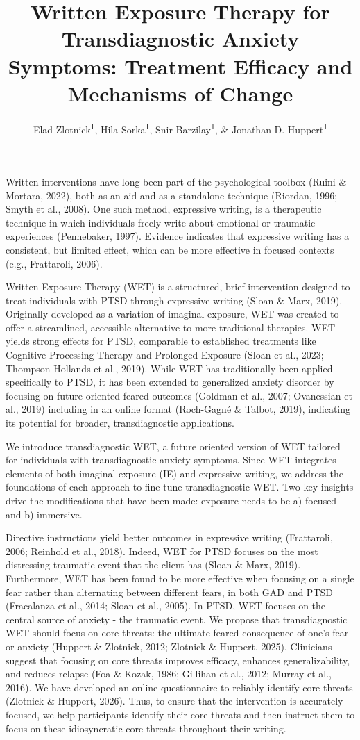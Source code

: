 \documentclass[
  man,floatsintext]{apa7}
\title{Written Exposure Therapy for Transdiagnostic Anxiety Symptoms: Treatment Efficacy and Mechanisms of Change}
\author{Elad Zlotnick\textsuperscript{1}, Hila Sorka\textsuperscript{1}, Snir Barzilay\textsuperscript{1}, \& Jonathan D. Huppert\textsuperscript{1}}
\date{}
\affiliation{\vspace{0.5cm}\textsuperscript{1} The Hebrew University of Jerusalem}
\begin{document}
\maketitle

Written interventions have long been part of the psychological toolbox (Ruini \& Mortara, 2022),
both as an aid and as a standalone technique (Riordan, 1996; Smyth et al., 2008).
One such method, expressive writing, is a therapeutic technique in which individuals freely write about emotional or traumatic experiences (Pennebaker, 1997).
Evidence indicates that expressive writing has a consistent, but limited effect, which can be more effective in focused contexts (e.g., Frattaroli, 2006).

Written Exposure Therapy (WET) is a structured, brief intervention designed to treat individuals with PTSD through expressive writing (Sloan \& Marx, 2019).
Originally developed as a variation of imaginal exposure, WET was created to offer a streamlined, accessible alternative to more traditional therapies.
WET yields strong effects for PTSD, comparable to established treatments like Cognitive Processing Therapy and Prolonged Exposure (Sloan et al., 2023; Thompson-Hollands et al., 2019).
While WET has traditionally been applied specifically to PTSD, it has been extended to generalized anxiety disorder by focusing on future-oriented feared outcomes (Goldman et al., 2007; Ovanessian et al., 2019) including in an online format (Roch-Gagné \& Talbot, 2019), indicating its potential for broader, transdiagnostic applications.

We introduce transdiagnostic WET, a future oriented version of WET tailored for individuals with transdiagnostic anxiety symptoms.
Since WET integrates elements of both imaginal exposure (IE) and expressive writing, we address the foundations of each approach to fine-tune transdiagnostic WET.
Two key insights drive the modifications that have been made: exposure needs to be a) focused and b) immersive.

Directive instructions yield better outcomes in expressive writing (Frattaroli, 2006; Reinhold et al., 2018).
Indeed, WET for PTSD focuses on the most distressing traumatic event that the client has (Sloan \& Marx, 2019).
Furthermore, WET has been found to be more effective when focusing on a single fear rather than alternating between different fears, in both GAD and PTSD (Fracalanza et al., 2014; Sloan et al., 2005).
In PTSD, WET focuses on the central source of anxiety - the traumatic event.
We propose that transdiagnostic WET should focus on core threats: the ultimate feared consequence of one's fear or anxiety (Huppert \& Zlotnick, 2012; Zlotnick \& Huppert, 2025).
Clinicians suggest that focusing on core threats improves efficacy, enhances generalizability, and reduces relapse
(Foa \& Kozak, 1986; Gillihan et al., 2012; Murray et al., 2016).
We have developed an online questionnaire to reliably identify core threats (Zlotnick \& Huppert, 2026).
Thus, to ensure that the intervention is accurately focused, we help participants identify their core threats and then instruct them to focus on these idiosyncratic core threats throughout their writing.
\end{document}
